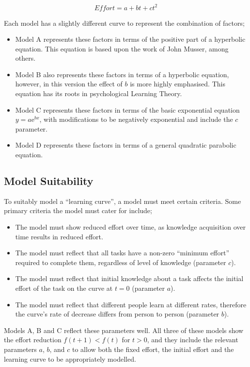 \documentclass[a4paper,10pt]{article}
\begin{document}
\begin{equation} \label{eq:4}
\textit{Effort} = a+bt+ct^2\tag{D}
\end{equation}

Each model has a slightly different curve to represent the combination of factors;

\begin{itemize}
 \item Model A represents these factors in terms of the positive part of a hyperbolic equation. This equation is based upon the work of John Musser, among others.
 \item Model B also represents these factors in terms of a hyperbolic equation, however, in this version the effect of $b$ is more highly emphasised. This equation has its roots in psychological Learning Theory.
 \item Model C represents these factors in terms of the basic exponential equation $y = a \mathrm{e}^{bx}$, with modifications to be negatively exponential and include the $c$ parameter.
 \item Model D represents these factors in terms of a general quadratic parabolic equation.
\end{itemize}

\subsection{Model Suitability}
To suitably model a ``learning curve'', a model must meet certain criteria. Some primary criteria the model must cater for include;
\begin{itemize}
 \item The model must show reduced effort over time, as knowledge acquisition over time results in reduced effort.
 \item The model must reflect that all tasks have a non-zero ``minimum effort'' required to complete them, regardless of level of knowledge (parameter $c$).
 \item The model must reflect that initial knowledge about a task affects the initial effort of the task on the curve at $t=0$ (parameter $a$).
 \item The model must reflect that different people learn at different rates, therefore the curve's rate of decrease differs from person to person (parameter $b$).
\end{itemize}

Models A, B and C reflect these parameters well. All three of these models show the effort reduction $f(t+1) < f(t)$ for $t > 0$, and they include the relevant parameters $a$, $b$, and $c$ to allow both the fixed effort, the initial effort and the learning curve to be appropriately modelled.
\end{document}
